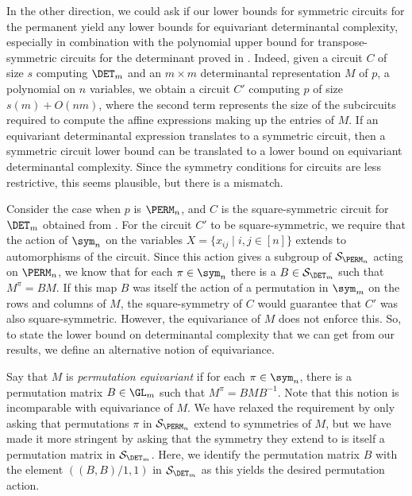 \documentclass{toc}
\begin{document}
In the other direction, we could ask if our lower bounds for symmetric circuits for the permanent yield any lower bounds for equivariant determinantal complexity, especially in combination with the polynomial upper bound for transpose-symmetric circuits for the determinant proved in .  Indeed, given a circuit $C$ of size $s$ computing $\DET_m$ and an $m\times m$ determinantal representation $M$ of $p$, a polynomial on $n$ variables, we obtain a circuit $C'$ computing $p$ of size $s(m)+ O(nm)$, where the second term represents the size of the subcircuits required to compute the affine expressions making up the entries of $M$.  If an equivariant determinantal expression translates to a symmetric circuit, then a symmetric circuit lower bound can be translated to a lower bound on equivariant determinantal complexity.  Since the symmetry conditions for circuits are less restrictive, this seems plausible, but there is a mismatch.

Consider the case when $p$ is $\PERM_n$, and $C$ is the
square-symmetric %
circuit for $\DET_m$ obtained from .  For the circuit $C'$ to be square-symmetric, we require that the action of $\sym_n$ on the variables $X =\{x_{ij} \mid i,j \in [n]\}$ extends to automorphisms of the circuit.  Since this action gives a subgroup of $\mathcal{S}_{\PERM_n}$ acting on $\PERM_n$, we know that for each $\pi \in \sym_n$ there is a $B \in \mathcal{S}_{\DET_m}$ such that $M^{\pi} = BM$.  If this map $B$ was itself the action of a permutation in $\sym_m$ on the rows and columns of $M$, the square-symmetry of $C$ would guarantee that $C'$ was also square-symmetric.  %
However, the equivariance of $M$ does not enforce this.  So, to state the lower bound on determinantal complexity that we can get from our results, we define an alternative notion of equivariance.

Say that $M$ is \emph{permutation equivariant} if for each $\pi \in
\sym_n$, there is a permutation matrix $B \in \GL_m$ such that
$M^{\pi} = BMB^{-1}$.  Note that this notion is incomparable with
equivariance of $M$.  We have relaxed the requirement by only asking
that permutations $\pi$ in $\mathcal{S}_{\PERM_n}$ extend to
symmetries of $M$, but we have made it more stringent by asking that
the symmetry they extend to is itself a permutation matrix in
$\mathcal{S}_{\DET_m}$.  Here, we identify the permutation matrix $B$
with the element $((B,B)/1,1)$ in $\mathcal{S}_{\DET_m}$ as this yields
the desired permutation action.
\end{document}
